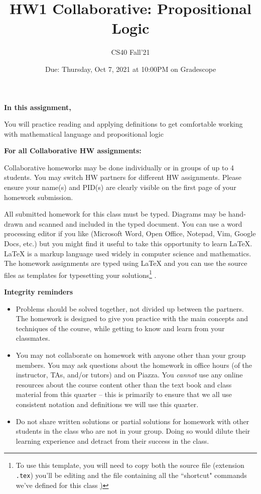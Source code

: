 \documentclass[12pt, oneside]{article}
\title{HW1 Collaborative: Propositional Logic}
\author{CS40 Fall'21}
\date{Due: Thursday, Oct 7, 2021 at 10:00PM on Gradescope}
\begin{document}
\maketitle

{\bf In this assignment,}

You will practice reading and
applying definitions to get comfortable working with mathematical language and propositional logic

{\bf For all Collaborative HW assignments:}

Collaborative homeworks may be done individually or in groups of up to 4 students. You may switch HW partners for different HW assignments.  Please ensure your name(s) and PID(s) are clearly visible on the first page of your homework submission.

All submitted homework for this class must be typed. Diagrams may be hand-drawn and scanned and included in the typed document. You can use a word processing editor if you like (Microsoft Word, Open Office, Notepad, Vim, Google Docs, etc.) but you might find it useful to take this opportunity to learn LaTeX. LaTeX is a markup language used widely in computer science and mathematics. The homework assignments are typed using LaTeX and you can use the source files as templates for typesetting your solutions\footnote{To use this template, you will need to copy both the source file (extension \texttt{.tex})  you'll be editing
and the file containing all the ``shortcut" commands we've defined for this class \href{https://drive.google.com/file/d/1FmQvgByKnNjTpIkAUw31TGWYrQZM-HK0/view?usp=sharing})} .


{\bf Integrity reminders}
\begin{itemize}
\item Problems should be solved together, not divided up between the partners. The homework is
designed to give you practice with the main concepts and techniques of the course, while getting to know and learn from your classmates.
\item You may not collaborate on homework with anyone other than your group members.
You may ask questions about the homework in office hours (of the instructor, TAs, and/or tutors) and 
on Piazza.  You \emph{cannot} use any online resources about the course content other than the text
book and class material from this quarter -- this is primarily to ensure that we all use consistent notation and
definitions we will use this quarter.
\item Do not share written solutions or partial solutions for homework with other students in the class who are not in your group. Doing so would dilute their learning experience and detract from their success in the class.
\end{itemize}
\end{document}
